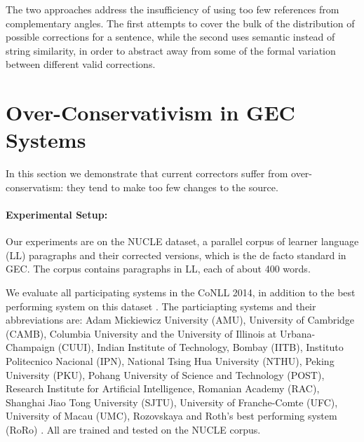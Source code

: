 \documentclass[letter,11pt]{article}
\begin{document}
The two approaches address the insufficiency of using too few references from
complementary angles. 
The first attempts to cover the bulk of the distribution of possible
corrections for a sentence, while the second
uses semantic instead of string similarity, in order to abstract away
from some of the formal variation between different valid corrections.

\section{Over-Conservativism in GEC Systems}\label{sec:formal_conservatism}



In this section we demonstrate that current correctors
suffer from over-conservatism: they tend to make too few changes to the source. 


\paragraph{Experimental Setup:}\label{par:experimental_setup}

Our experiments are on the NUCLE dataset,
a parallel corpus of learner language (LL) paragraphs and their corrected versions,
which is the de facto standard in GEC.
The corpus contains paragraphs in LL, each of about 400 words.

We evaluate all participating systems in the CoNLL 2014,
in addition to the best performing system on this dataset \cite{rozovskaya2014building}.
The particiapting systems and their abbreviations are: Adam Mickiewicz University (AMU),
University of Cambridge (CAMB), Columbia University and the University of Illinois at Urbana-Champaign (CUUI),
Indian Institute of Technology, Bombay (IITB), Instituto Politecnico Nacional (IPN),
National Tsing Hua University (NTHU), Peking University (PKU), Pohang University of Science and Technology (POST),
Research Institute for Artificial Intelligence, Romanian Academy (RAC), Shanghai Jiao Tong University (SJTU),
University of Franche-Comte (UFC), University of Macau (UMC),
Rozovskaya and Roth's best performing system (RoRo) \cite{rozovskaya2016grammatical}.
All are trained and tested on the NUCLE corpus.
\end{document}
